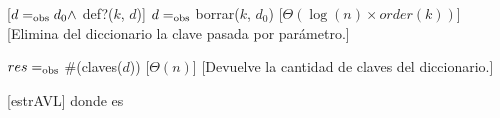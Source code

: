 \begin{Interfaz}
    [$d =_{\mathrm{obs}} d_0 \land$ def?($k$, $d$)]
    {$d =_{\mathrm{obs}}$ borrar($k$, $d_0$)}
    [$\Theta(\log(n) \times order(k))$]
    [Elimina del diccionario la clave pasada por par\'ametro.]

    {$res =_{\mathrm{obs}}$ \#(claves($d$))}
    [$\Theta(n)$]
    [Devuelve la cantidad de claves del diccionario.]

\end{Interfaz}

\begin{Representacion}

  \begin{Estructura}{\diccLogKS}[estrAVL]
    \hspace*{3mm}donde  es 
  \end{Estructura} 



\end{Representacion}
